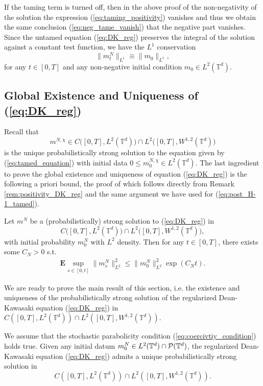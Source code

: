 \begin{rem}\label{rem:positivity_DK_reg}
If the taming term is turned off, then in the above proof of the non-negativity of the solution the expression (\ref{eq:taming_positivity}) vanishes and thus we obtain the same conclusion (\ref{eq:neg_tame_vanish}) that the negative part vanishes. Since the untamed equation (\ref{eq:DK_reg}) preserves the integral of the solution against a constant test function, we have the $L^1$ conservation 
\begin{equation}
\|m^N_t\|_{L^1}  \equiv \|m_0\|_{L^1},
\end{equation}
for any $t \in [0,T]$ and any non-negative initial condition $m_0 \in L^2(\mathbb{T}^d)$.
\end{rem}

\subsection{Global Existence and Uniqueness of (\ref{eq:DK_reg})}
Recall that
\[
m^{N,\chi} \in C\big([0,T], L^2(\mathbb{T}^d)\big) \cap L^2\big([0,T], W^{1,2}(\mathbb{T}^d)\big)
\]
is the unique probabilistically strong solution to the equation given by (\ref{eq:tamed_equation}) with initial data $0 \leq m_0^{N,\chi} \in L^2(\mathbb{T}^d)$. The last ingredient to prove the global existence and uniqueness of equation (\ref{eq:DK_reg})  is the following a priori bound, the proof of which follows directly from Remark \ref{rem:positivity_DK_reg} and the same argument we have used for (\ref{eq:post_H-1_tamed}).
\begin{lem}\label{lem:energy_reg_DK}Let $m^{N}$ be a (probabilistically) strong solution to (\ref{eq:DK_reg}) in 
\[
C\big([0,T], L^2(\mathbb{T}^d)\big) \cap L^2\big([0,T], W^{1,2}(\mathbb{T}^d)\big),
\]
with initial probability $m_0^N$ with $L^2$ density. Then for any $t \in [0,T]$, there exists some $C_N > 0$ s.t.
\begin{equation}\label{eq:apri_H-1}
\begin{split}
    \mathbf{E}\sup_{s \in [0,t]}\|m_s^{N}\|^2_{L^2} \leq  \|m_0^{N}\|^2_{L^2}\exp(C_Nt).
\end{split}
\end{equation}
\end{lem}
We are ready to prove the main result of this section, i.e. the existence and uniqueness of the probabilistically strong solution of the regularized Dean-Kawasaki equation (\ref{eq:DK_reg}) in $C([0,T],L^2(\mathbb{T}^d)) \cap L^2([0,T],W^{1,2}(\mathbb{T}^d))$. 
\begin{cor}\label{thm:main_thm_1_full}We assume that the stochastic parabolicity condition (\ref{eq:coercivtiy_condition}) holds true. Given any initial datum $m_0^N \in L^2(\mathbb{T}^d) \cap \mathcal{P}(\mathbb{T}^d)$, the regularized Dean-Kawasaki equation (\ref{eq:DK_reg}) admits a unique probabilistically strong solution in 
\[
C([0,T],L^2(\mathbb{T}^d)) \cap L^2([0,T],W^{1,2}(\mathbb{T}^d)).
\]
\end{cor}
